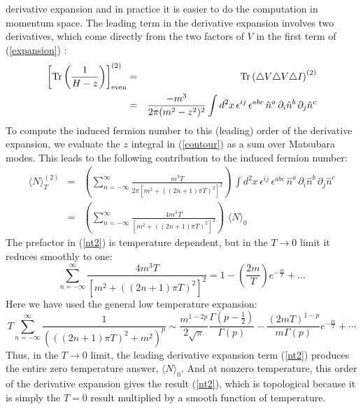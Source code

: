 \documentclass[a4paper,prd]{revtex4}
\begin{document}
derivative expansion and in practice it is easier to do the
computation in momentum space.    The leading
term in the derivative expansion  involves two
derivatives, which come directly from the two factors of $V$ in the
first term of (\ref{expansion}) :
\begin{eqnarray}
\label{fn2}
\left[\textrm{Tr}\left(\frac{1}{H-z}\right)\right]_{\rm{even}}^{(2)}&=&\textrm{Tr}\left(\triangle V\triangle 
V\triangle I\right)^{(2)}\nonumber \\
&=&\frac{-m^{3}}{2 \pi(m^{2}-z^{2})^{2}} \int d^{2}x \, 
\epsilon^{ij}\, \epsilon^{abc}\, \hat{n}^{a}\, \partial_i\hat{n}^{b}\, \partial_j\hat{n}^{c}
\end{eqnarray}
To compute the induced fermion number to this (leading) order of the
derivative expansion, we evaluate the $z$ integral in
(\ref{contour}) as a sum over Matsubara modes. This leads to the
following contribution to the induced fermion  number:
\begin{eqnarray}
\label{derivative2}
\langle N\rangle _T^{(2)} & = &   \left(\sum_{n=-\infty}^\infty
\frac{m^3 T}{2\pi  [m^2 +((2 n+1)\pi T)^2]^2}\right) \, \int d^{2}x\, 
\epsilon^{ij}\, 
\epsilon^{abc}\, 
\hat{n}^{a}\, \partial_i \hat{n}^{b}\, \partial_j \hat{n}^{c}  
\nonumber \\  {}  
& = & 
\left(\sum_{n=-\infty}^\infty \frac{4 m^3 T}{[m^2 +((2n+1)\pi T)^2]^2}
\right)\,\,
\langle N\rangle_0 
\label{nt2}
\end{eqnarray}
The prefactor in (\ref{nt2}) is temperature dependent, but in
the 
$T\rightarrow 0$ limit it reduces smoothly to one:
\begin{equation}
\sum_{n=-\infty}^\infty \frac{4 m^3 T}{[m^2 +
((2n+1)\pi T)^2]^2}=1-\left(\frac{2 m}{T}\right)e^{-\frac{m}{T}}+\dots
\label{2der}
\end{equation}
Here we have used the general low temperature expansion:
\begin{equation}
T\sum_{n=-\infty}^\infty \frac{1}{(((2n+1)\pi T)^{2}+m^{2})^{p}} \sim 
\frac{m^{1-2p}}{2\sqrt{\pi}} \frac{\Gamma (p-\frac{1}{2})}{\Gamma
(p)}-\frac{(2mT)^{1-p}}{m\Gamma (p)} e^{-\frac{m}{T}}+ \cdots 
\label{identity}
\end{equation}
Thus, in the  $T\to 0$ limit, the leading derivative expansion term
(\ref{nt2}) produces the entire zero temperature answer, $\langle
N\rangle_0$. And at nonzero temperature, this order of the derivative
expansion gives the result (\ref{nt2}), which is topological because
it is simply the $T=0$ result multiplied by a smooth function of
temperature.
 
\end{document}
